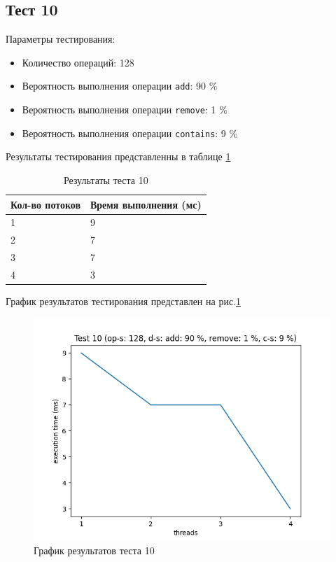\subsection*{Тест 10}

Параметры тестирования:

\begin{itemize}
    \item Количество операций: 128
    \item Вероятность выполнения операции \verb|add|: 90 \%
    \item Вероятность выполнения операции \verb|remove|: 1 \%
    \item Вероятность выполнения операции \verb|contains|: 9 \%
\end{itemize}

Результаты тестирования представленны в таблице \ref{tab:results10}


\begin{table}[H]
    \centering
    \begin{tabular}{|l|l|}
        \hline
        Кол-во потоков & Время выполнения (мс) \\
        \hline
        1 & 9 \\
        \hline
        2 & 7 \\
        \hline
        3 & 7 \\
        \hline
        4 & 3 \\
        \hline
    \end{tabular}
    \caption{Результаты теста 10}
    \label{tab:results10}
\end{table}
        

График результатов тестирования представлен на рис.\ref{fig:plot10}

\begin{figure}[H]
    \centering
    \includegraphics[width=0.7\linewidth]{photo/plot10}
    \caption{График результатов теста 10}
    \label{fig:plot10}
\end{figure}

